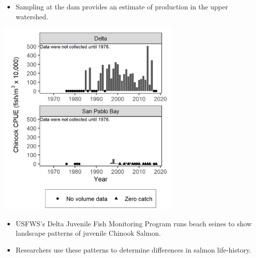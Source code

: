 \documentclass[]{article}\usepackage[]{graphicx}\usepackage[]{color}
\begin{document}
\begin{Row}
\begin{Cell}{1}
{\begin{center}
\begin{itemize}[leftmargin=1.5cm,rightmargin=1cm,topsep=10pt]
          spawning grounds to the ocean.
          \item Sampling at the dam provides an estimate of production in the upper 
          watershed.
        \end{itemize}
      \end{center}
    }
  \end{Cell}
  \begin{Cell}{1}
    {\large 
      \begin{center}
        \includegraphics[width=9cm,align=m]{figures/salmon/djfmp_chn_fig_1966.png}
        \begin{itemize}[leftmargin=1.5cm,rightmargin=1cm,topsep=10pt]
          \item USFWS's Delta Juvenile Fish Monitoring Program runs beach seines to 
          show landscape patterns of juvenile Chinook Salmon.
          \item Researchers use these patterns to determine differences in salmon 
          life-history.
        \end{itemize}
      \end{center}
    }
  \end{Cell}
  
\end{Row}
\end{document}
